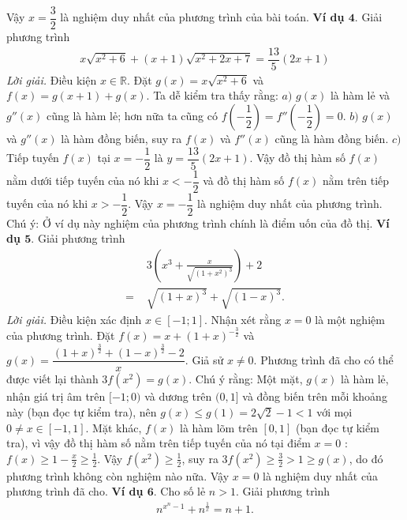 \begin{multicols}{2}
	\vskip 0.1cm
	Vậy $x=\dfrac{3}{2}$ là nghiệm duy nhất của phương trình của bài toán.
	\vskip 0.1cm
	\textbf{\color{diendantoanhoc}Ví dụ $\pmb{4.}$} Giải phương trình
	\begin{align*}
		x\sqrt{x^2\!+\!6}\!+\!(x\!+\!1)\sqrt{x^2\!+\!2x\!+\!7}\!=\!\dfrac{13}{5}(2x\!+\!1)
	\end{align*}
	\textit{Lời giải.}  Điều kiện $x\in\mathbb R$. Đặt $g(x)=x\sqrt{x^2+6}$ và $f(x)=g(x+1)+g(x)$.
	\vskip 0.1cm
	Ta dễ kiểm tra thấy rằng:
	\vskip 0.1cm
	$a)$ $g(x)$ là hàm lẻ và $g''(x)$ cũng là hàm lẻ; hơn nữa ta cũng có $f(-\dfrac 12)=f''(-\dfrac 12)=0$.
	\vskip 0.1cm
	$b)$ $g(x)$ và $g''(x)$ là hàm đồng biến, suy ra $f(x)$ và $f''(x)$ cũng là hàm đồng biến.
	\vskip 0.1cm
	$c)$ Tiếp tuyến $f(x)$ tại $x=-\dfrac 12$ là $y=\dfrac{13}5(2x+1)$.
	\vskip 0.1cm
	Vậy đồ thị hàm số $f(x)$ nằm dưới tiếp tuyến của nó khi $x<-\dfrac 12$ và đồ thị hàm số $f(x)$ nằm trên tiếp tuyến của nó khi $x>-\dfrac 12$.
	\vskip 0.1cm
	Vậy $x=-\dfrac{1}{2}$ là nghiệm duy nhất của phương trình.
	\vskip 0.1cm
	Chú ý: Ở ví dụ này nghiệm của phương trình chính là điểm uốn của đồ thị.
	\vskip 0.1cm
	\textbf{\color{diendantoanhoc}Ví dụ $\pmb{5.}$} Giải phương trình
	\begin{align*}
		&3\left(x^{3}+\frac{x}{\sqrt{\left(1+x^{2} \right)^{3}}} \right)+2\\
		=\,\,&\sqrt{\left(1+x \right)^{3}}+\sqrt{\left(1-x \right)^{3}}.
	\end{align*}
	\textit{Lời giải.}  Điều kiện xác định $x\in[-1;1]$. Nhận xét rằng $x=0$ là một nghiệm của phương trình. Đặt $f(x)=x+(1+x)^{-\frac 32}$ và $g(x)=\dfrac{(1+x)^{\frac 32}+(1-x)^{\frac 32}-2}x$.
	\vskip 0.1cm
	Giả sử $x\ne 0$. Phương trình đã cho có thể được viết lại thành $3f(x^2)=g(x)$.
	\vskip 0.1cm
	Chú ý rằng:
	\vskip 0.1cm
	Một mặt, $g(x)$ là hàm lẻ, nhận giá trị âm trên $[-1;0)$ và dương trên $(0, 1]$ và đồng biến trên mỗi khoảng này (bạn đọc tự kiểm tra), nên $g(x)\le g(1)=2\sqrt 2-1 <1$ với mọi $0\ne  x\in[-1,1]$.
	\vskip 0.1cm
	Mặt khác, $f(x)$ là hàm lõm trên $[0,1]$ (bạn đọc tự kiểm tra), vì vậy đồ thị hàm số nằm trên tiếp tuyến của nó tại điểm $x=0$ : $f(x)\ge 1-\frac x2\ge \frac 12$.
	\vskip 0.1cm
	Vậy $f(x^2)\ge \frac 12$, suy ra $3f(x^2)\ge \frac 32 > 1\ge g(x)$, do đó phương trình không còn nghiệm nào nữa. 
	\vskip 0.1cm
	Vậy $x=0$ là nghiệm duy nhất của phương trình đã cho.
	\vskip 0.1cm
	\textbf{\color{diendantoanhoc}Ví dụ $\pmb{6.}$} Cho số lẻ $n>1$. Giải phương trình
	\begin{align*}
		n^{x^n-1}+n^{\frac{1}{x}}=n+1.
	\end{align*}

\end{multicols}
